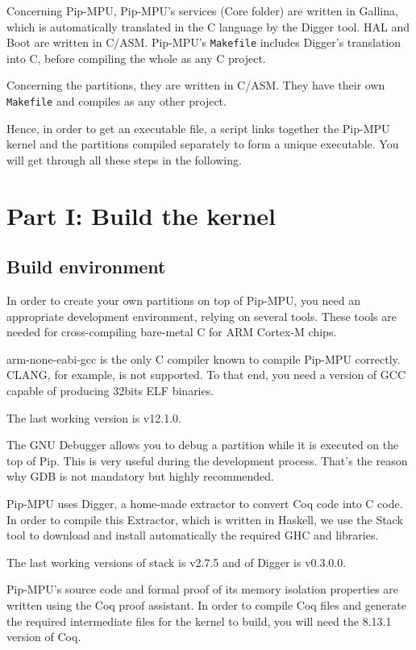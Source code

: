 \documentclass[10pt,a4paper,titlepage]{refart}
\begin{document}
Concerning Pip-MPU, Pip-MPU's services (Core folder) are written in Gallina, which is automatically translated in the C language by the Digger tool.
HAL and Boot are written in C/ASM.
Pip-MPU's \texttt{Makefile} includes Digger's translation into C, before compiling the whole as any C project.

Concerning the partitions, they are written in C/ASM.
They have their own \texttt{Makefile} and compiles as any other project.

Hence, in order to get an executable file, a script links together the Pip-MPU kernel and the partitions compiled separately to form a unique executable.
You will get through all these steps in the following.

\section{Part I: Build the kernel} \label{first}

\subsection{Build environment}
In order to create your own partitions on top of Pip-MPU, you need an appropriate development environment, relying on several tools.
These tools are needed for cross-compiling bare-metal C for ARM Cortex-M chips.

arm-none-eabi-gcc is the only C compiler known to compile Pip-MPU correctly.
CLANG, for example, is not supported. To that end, you need a version of GCC capable of producing 32bits ELF binaries.

The last working version is v12.1.0.

 
The GNU Debugger allows you to debug a partition while it is executed on the
top of Pip. This is very useful during the development process. That's the
reason why GDB is not mandatory but highly recommended.


Pip-MPU uses Digger, a home-made extractor to convert Coq code into C code.
In order to compile this Extractor, which is written in Haskell, we use the Stack tool to download and install automatically the required GHC and libraries.

The last working versions of stack is v2.7.5 and of Digger is v0.3.0.0.

Pip-MPU's source code and formal proof of its memory isolation properties are written
using the Coq proof assistant. In order to compile Coq files and
generate the required intermediate files for the kernel to build, you will need the 8.13.1 version of Coq.
\end{document}
